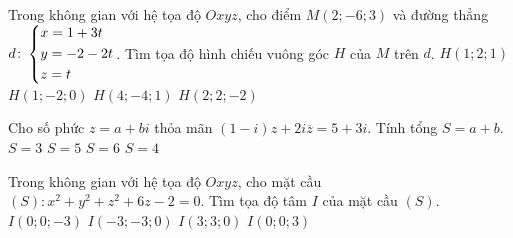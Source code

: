 \begin{ex}%
Trong không gian với hệ tọa độ $Oxyz$, cho điểm $M(2;-6;3)$ và đường thẳng $d\colon\left\{\begin{aligned}& x=1+3t\\& y=-2-2t\\& z=t\end{aligned}\right.$. Tìm tọa độ hình chiếu vuông góc $H$ của $M$ trên $d$.
\choice
{$H(1;2;1)$}
{$H(1;-2;0)$}
{\True $H(4;-4;1)$}
{$H(2;2;-2)$}
\end{ex} 

\begin{ex}%
Cho số phức $z=a+bi$ thỏa mãn $(1-i)z+2i\overline{z}=5+3i$. Tính tổng $S=a+b$.
\choice
{\True $S=3$}
{$S=5$}
{$S=6$}
{$S=4$}
\end{ex}

\begin{ex}%
Trong không gian với hệ tọa độ $Oxyz$, cho mặt cầu $(S)\colon x^2+y^2+z^2+6z-2=0$. Tìm tọa độ tâm $I$ của mặt cầu $(S)$.
\choice
{\True $I(0;0;-3)$}
{$I(-3;-3;0)$}
{$I(3;3;0)$}
{$I(0;0;3)$}
\end{ex}

